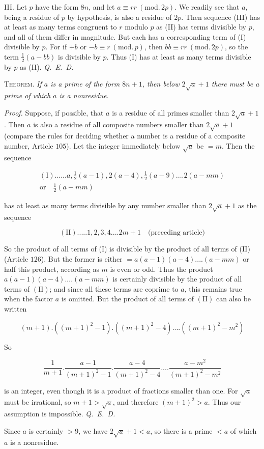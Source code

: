 III. Let $p$ have the form $8n$, and let $a\equiv rr\ (\mathrm{mod.}\,2p)$. We readily see that $a$, being a residue of $p$ by hypothesis, is also a residue of $2p$. Then sequence (III) has at least as many terms congruent to $r$ modulo $p$ as (II) has terms divisible by $p$, and all of them differ in magnitude. But each has a corresponding term of (I) divisible by $p$. For if $+b$ or $-b\equiv r\ (\mathrm{mod.}\,p)$, then $bb\equiv rr\ (\mathrm{mod.}\,2p)$, so the term $\frac12(a-bb)$ is divisible by $p$. Thus (I) has at least as many terms divisible by $p$ as (II). \mbox{\textit{Q. E. D.}}

\textsc{Theorem.} \textit{If $a$ is a prime of the form $8n+1$, then below $2\surd a+1$ there must be a prime of which $a$ is a nonresidue.}

\textit{Proof.} Suppose, if possible, that $a$ is a residue of all primes smaller than $2\surd a+1$. Then $a$ is also a residue of all composite numbers smaller than $2\surd a+1$ (compare the rules for deciding whether a number is a residue of a composite number, Article $105$). Let the integer immediately below $\surd a$ be $=m$. Then the sequence

\[
\begin{gathered}(\mathrm I)......a,\tfrac12(a-1),2(a-4),\tfrac12(a-9)....2(a-mm)\\ \text{or}\quad\tfrac12(a-mm)\end{gathered}
\]

has at least as many terms divisible by any number smaller than $2\surd a+1$ as the sequence

\[
(\mathrm{II}).....1,2,3,4....2m+1\quad\text{(preceding article)}
\]

So the product of all terms of (I) is divisible by the product of all terms of (II) (Article $126$). But the former is either \mbox{$=a(a-1)(a-4)....(a-mm)$} or half this product, according as $m$ is even or odd. Thus the product $a(a-1)(a-4)....(a-mm)$ is certainly divisible by the product of all terms of $(\mathrm{II})$; and since all these terms are coprime to $a$, this remains true when the factor $a$ is omitted. But the product of all terms of $(\mathrm{II})$ can also be written

\[
(m+1).((m+1)^2-1).((m+1)^2-4)....((m+1)^2-m^2)
\]

So

\[
\frac1{m+1}.\frac{a-1}{(m+1)^2-1}.\frac{a-4}{(m+1)^2-4}....\frac{a-m^2}{(m+1)^2-m^2}
\]

is an integer, even though it is a product of fractions smaller than one. For $\surd a$ must be irrational, so $m+1>\surd a$, and therefore $(m+1)^2>a.$ Thus our assumption is impossible. \mbox{\textit{Q. E. D.}}

Since $a$ is certainly $>9$, we have $2\surd a+1<a$, so there is a prime $<a$ of which $a$ is a nonresidue.
